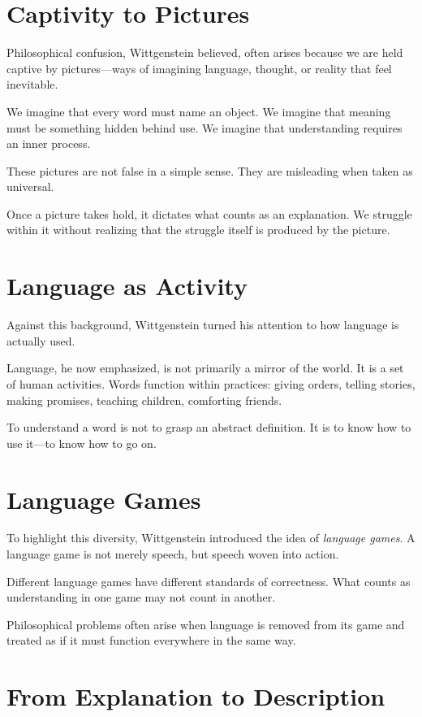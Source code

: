 \documentclass[11pt]{article}
\begin{document}
\section*{Captivity to Pictures}

Philosophical confusion, Wittgenstein believed, often arises because we are held captive by pictures—ways of imagining language, thought, or reality that feel inevitable.

We imagine that every word must name an object.  
We imagine that meaning must be something hidden behind use.  
We imagine that understanding requires an inner process.

These pictures are not false in a simple sense. They are misleading when taken as universal.

Once a picture takes hold, it dictates what counts as an explanation. We struggle within it without realizing that the struggle itself is produced by the picture.

\section*{Language as Activity}

Against this background, Wittgenstein turned his attention to how language is actually used.

Language, he now emphasized, is not primarily a mirror of the world. It is a set of human activities. Words function within practices: giving orders, telling stories, making promises, teaching children, comforting friends.

To understand a word is not to grasp an abstract definition. It is to know how to use it—to know how to go on.

\section*{Language Games}

To highlight this diversity, Wittgenstein introduced the idea of \emph{language games}. A language game is not merely speech, but speech woven into action.

Different language games have different standards of correctness. What counts as understanding in one game may not count in another.

Philosophical problems often arise when language is removed from its game and treated as if it must function everywhere in the same way.

\section*{From Explanation to Description}
\end{document}
